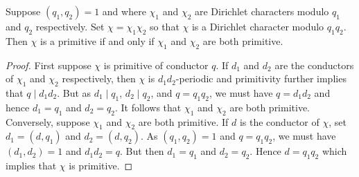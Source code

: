       \begin{proposition}\label{prop:primitive_characters_multiplicative_relatively_prime}
        Suppose $(q_{1},q_{2}) = 1$ and where $\chi_{1}$ and $\chi_{2}$ are Dirichlet characters modulo $q_{1}$ and $q_{2}$ respectively. Set $\chi = \chi_{1}\chi_{2}$ so that $\chi$ is a Dirichlet character modulo $q_{1}q_{2}$. Then $\chi$ is a primitive if and only if $\chi_{1}$ and $\chi_{2}$ are both primitive.
      \end{proposition}
      \begin{proof}
        First suppose $\chi$ is primitive of conductor $q$. If $d_{1}$ and $d_{2}$ are the conductors of $\chi_{1}$ and $\chi_{2}$ respectively, then $\chi$ is $d_{1}d_{2}$-periodic and primitivity further implies that $q \mid d_{1}d_{2}$. But as $d_{1} \mid q_{1}$, $d_{2} \mid q_{2}$, and $q = q_{1}q_{2}$, we must have $q = d_{1}d_{2}$ and hence $d_{1} = q_{1}$ and $d_{2} = q_{2}$. It follows that $\chi_{1}$ and $\chi_{2}$ are both primitive. Conversely, suppose $\chi_{1}$ and $\chi_{2}$ are both primitive. If $d$ is the conductor of $\chi$, set $d_{1} = (d,q_{1})$ and $d_{2} = (d,q_{2})$. As $(q_{1},q_{2}) = 1$ and $q = q_{1}q_{2}$, we must have $(d_{1},d_{2}) = 1$ and $d_{1}d_{2} = q$. But then $d_{1} = q_{1}$ and $d_{2} = q_{2}$. Hence $d = q_{1}q_{2}$ which implies that $\chi$ is primitive.
      \end{proof}
      
